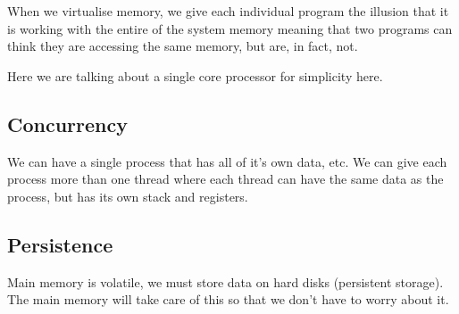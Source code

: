 When we virtualise memory, we give each individual program the illusion that it is working with the entire of the system memory meaning that two programs can think they are accessing the same memory, but are, in fact, not.

\begin{note}
    Here we are talking about a single core processor for simplicity here.
\end{note}

\subsection{Concurrency}\label{sub:concurrency}

We can have a single process that has all of it's own data, etc.
We can give each process more than one thread where each thread can have the same data as the process, but has its own stack and registers.

\subsection{Persistence}\label{sub:persistence}

Main memory is volatile, we must store data on hard disks (persistent storage).
The main memory will take care of this so that we don't have to worry about it.
